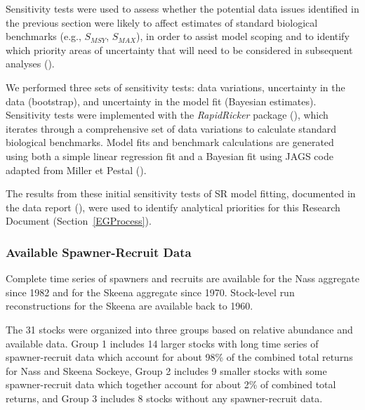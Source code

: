 \documentclass[french,11pt]{book}
\begin{document}
Sensitivity tests were used to assess whether the potential data issues identified in the previous section were likely to affect estimates of standard biological benchmarks (e.g., \(S_{MSY}\), \(S_{MAX}\)), in order to assist model scoping and to identify which priority areas of uncertainty that will need to be considered in subsequent analyses ().

We performed three sets of sensitivity tests: data variations, uncertainty in the data (bootstrap), and uncertainty in the model fit (Bayesian estimates). Sensitivity tests were implemented with the \emph{RapidRicker} package (), which iterates through a comprehensive set of data variations to calculate standard biological benchmarks. Model fits and benchmark calculations are generated using both a simple linear regression fit and a Bayesian fit using JAGS code adapted from Miller et Pestal ().

The results from these initial sensitivity tests of SR model fitting, documented in the data report (), were used to identify analytical priorities for this Research Document (Section~\ref{EGProcess}).

\subsubsection{Available Spawner-Recruit Data}\label{AvailableSRData}

Complete time series of spawners and recruits are available for the Nass aggregate since 1982 and for the Skeena aggregate since 1970. Stock-level run reconstructions for the Skeena are available back to 1960.

The 31 stocks were organized into three groups based on relative abundance and available data. Group 1 includes 14 larger stocks with long time series of spawner-recruit data which account for about 98\% of the combined total returns for Nass and Skeena Sockeye, Group 2 includes 9 smaller stocks with some spawner-recruit data which together account for about 2\% of combined total returns, and Group 3 includes 8 stocks without any spawner-recruit data.
\end{document}
